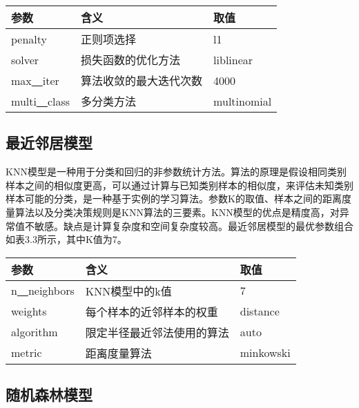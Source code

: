 \begin{table}[!htbp] 
    \centering
    \footnotesize
    \setlength{\tabcolsep}{20pt}
    \renewcommand{\arraystretch}{1.2}
\begin{tabular}{lll}
\toprule
参数 & 含义 & 取值 \\ \hline
penalty & 正则项选择 & l1 \\ 
solver & 损失函数的优化方法 & liblinear \\ 
max\underline{~~}iter & 算法收敛的最大迭代次数 & 4000\\ 
multi\underline{~~}class & 多分类方法 & multinomial \\ 
\bottomrule
\end{tabular}
\end{table}

\subsection{最近邻居模型}

KNN模型是一种用于分类和回归的非参数统计方法。算法的原理是假设相同类别样本之间的相似度更高，可以通过计算与已知类别样本的相似度，来评估未知类别样本可能的分类，是一种基于实例的学习算法。参数K的取值、样本之间的距离度量算法以及分类决策规则是KNN算法的三要素。KNN模型的优点是精度高，对异常值不敏感。缺点是计算复杂度和空间复杂度较高。最近邻居模型的最优参数组合如表3.3所示，其中K值为7。

\begin{table}[!h] 
    \centering
    \footnotesize
    \setlength{\tabcolsep}{20pt}
    \renewcommand{\arraystretch}{1}
\begin{tabular}{lll}
\toprule
参数 & 含义 & 取值 \\ \hline
n\underline{~~}neighbors & KNN模型中的k值 & 7 \\ 
weights & 每个样本的近邻样本的权重 & distance \\ 
algorithm & 限定半径最近邻法使用的算法 & auto\\ 
metric & 距离度量算法 & minkowski \\ 
\bottomrule
\end{tabular}
\end{table}

\subsection{随机森林模型}

